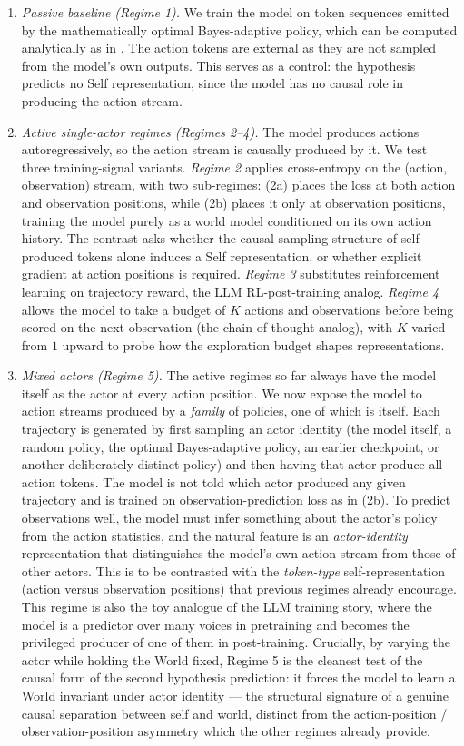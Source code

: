 \documentclass[11pt]{article}
\begin{document}
\begin{enumerate}
    \item \emph{Passive baseline (Regime 1).} We train the model on token sequences emitted by the mathematically optimal Bayes-adaptive policy, which can be computed analytically as in \citep{shai2024belief}. The action tokens are external as they are not sampled from the model's own outputs. This serves as a control: the hypothesis predicts no Self representation, since the model has no causal role in producing the action stream.
    \item \emph{Active single-actor regimes (Regimes 2--4).} The model produces actions autoregressively, so the action stream is causally produced by it. We test three training-signal variants. \emph{Regime 2} applies cross-entropy on the (action, observation) stream, with two sub-regimes: (2a) places the loss at both action and observation positions, while (2b) places it only at observation positions, training the model purely as a world model conditioned on its own action history. The contrast asks whether the causal-sampling structure of self-produced tokens alone induces a Self representation, or whether explicit gradient at action positions is required. \emph{Regime 3} substitutes reinforcement learning on trajectory reward, the LLM RL-post-training analog. \emph{Regime 4} allows the model to take a budget of $K$ actions and observations before being scored on the next observation (the chain-of-thought analog), with $K$ varied from $1$ upward to probe how the exploration budget shapes representations.
    \item \emph{Mixed actors (Regime 5).} The active regimes so far always have the model itself as the actor at every action position. We now expose the model to action streams produced by a \emph{family} of policies, one of which is itself. Each trajectory is generated by first sampling an actor identity (the model itself, a random policy, the optimal Bayes-adaptive policy, an earlier checkpoint, or another deliberately distinct policy) and then having that actor produce all action tokens. The model is not told which actor produced any given trajectory and is trained on observation-prediction loss as in (2b). To predict observations well, the model must infer something about the actor's policy from the action statistics, and the natural feature is an \emph{actor-identity} representation that distinguishes the model's own action stream from those of other actors. This is to be contrasted with the \emph{token-type} self-representation (action versus observation positions) that previous regimes already encourage. This regime is also the toy analogue of the LLM training story, where the model is a predictor over many voices in pretraining and becomes the privileged producer of one of them in post-training. Crucially, by varying the actor while holding the World fixed, Regime 5 is the cleanest test of the causal form of the second hypothesis prediction: it forces the model to learn a World invariant under actor identity --- the structural signature of a genuine causal separation between self and world, distinct from the action-position / observation-position asymmetry which the other regimes already provide.

\end{enumerate}
\end{document}
